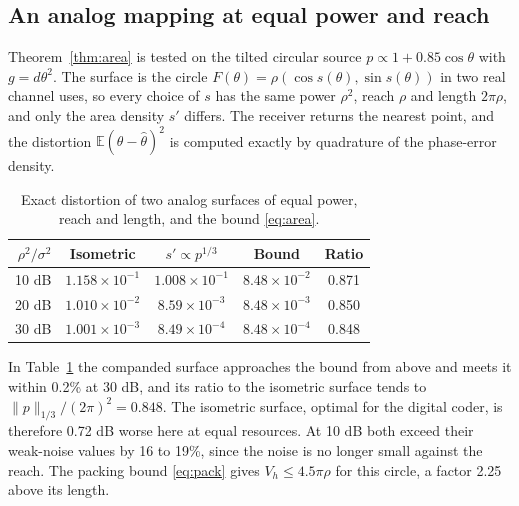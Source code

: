 \documentclass[journal]{IEEEtran}
\newcommand{\E}{\mathbb E}
\begin{document}
\subsection{An analog mapping at equal power and reach}
Theorem~\ref{thm:area} is tested on the tilted circular source $p\propto1+0.85\cos\theta$ with $g=d\theta^2$. The surface is the circle $F(\theta)=\rho(\cos s(\theta),\sin s(\theta))$ in two real channel uses, so every choice of $s$ has the same power $\rho^2$, reach $\rho$ and length $2\pi\rho$, and only the area density $s'$ differs. The receiver returns the nearest point, and the distortion $\E(\theta-\hat\theta)^2$ is computed exactly by quadrature of the phase-error density.
\begin{table}[t]
\caption{Exact distortion of two analog surfaces of equal power, reach and length, and the bound \eqref{eq:area}.}\label{tab:analog}\centering
\begin{tabular}{rcccc}\toprule
$\rho^2/\sigma^2$ & Isometric & $s'\propto p^{1/3}$ & Bound & Ratio\\\midrule
10 dB & $1.158\!\times\!10^{-1}$ & $1.008\!\times\!10^{-1}$ & $8.48\!\times\!10^{-2}$ & 0.871\\
20 dB & $1.010\!\times\!10^{-2}$ & $8.59\!\times\!10^{-3}$ & $8.48\!\times\!10^{-3}$ & 0.850\\
30 dB & $1.001\!\times\!10^{-3}$ & $8.49\!\times\!10^{-4}$ & $8.48\!\times\!10^{-4}$ & 0.848\\\bottomrule
\end{tabular}\end{table}
In Table~\ref{tab:analog} the companded surface approaches the bound from above and meets it within 0.2\% at 30 dB, and its ratio to the isometric surface tends to $\|p\|_{1/3}/(2\pi)^2=0.848$. The isometric surface, optimal for the digital coder, is therefore 0.72 dB worse here at equal resources. At 10 dB both exceed their weak-noise values by 16 to 19\%, since the noise is no longer small against the reach. The packing bound \eqref{eq:pack} gives $V_h\le4.5\pi\rho$ for this circle, a factor 2.25 above its length.
\end{document}
